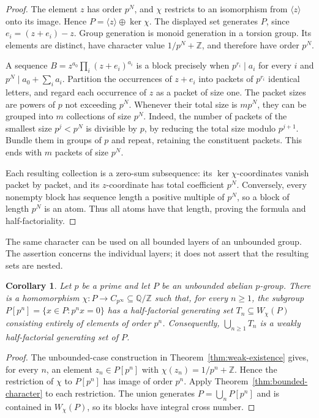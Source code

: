 \documentclass[11pt,reqno]{amsart}
\numberwithin{equation}{section}
\newtheorem{corollary}[theorem]{Corollary}
\theoremstyle{definition}
\theoremstyle{remark}
\newcommand{\Z}{\mathbb Z}
\newcommand{\Q}{\mathbb Q}
\begin{document}
\begin{proof}
The element $z$ has order $p^N$, and $\chi$ restricts to an
isomorphism from $\langle z\rangle$ onto its image. Hence
$P=\langle z\rangle\oplus\ker\chi$. The displayed set generates
$P$, since $e_i=(z+e_i)-z$. Group generation is monoid generation
in a torsion group. Its elements are distinct, have character value
$1/p^N+\Z$, and therefore have order $p^N$.

A sequence $B=z^{a_0}\prod_i(z+e_i)^{a_i}$ is a block precisely
when $p^{r_i}\mid a_i$ for every $i$ and
$p^N\mid a_0+\sum_i a_i$. Partition the occurrences of $z+e_i$
into packets of $p^{r_i}$ identical letters, and regard each
occurrence of $z$ as a packet of size one. The packet sizes are
powers of $p$ not exceeding $p^N$. Whenever their total size is
$mp^N$, they can be grouped into $m$ collections of size $p^N$.
Indeed, the number of packets of the smallest size $p^j<p^N$
is divisible by $p$, by reducing the total size modulo $p^{j+1}$.
Bundle them in groups of $p$ and repeat, retaining the constituent
packets. This ends with $m$ packets of size $p^N$.

Each resulting collection is a zero-sum subsequence: its
$\ker\chi$-coordinates vanish packet by packet, and its
$z$-coordinate has total coefficient $p^N$. Conversely, every
nonempty block has sequence length a positive multiple of $p^N$,
so a block of length $p^N$ is an atom. Thus all atoms have that
length, proving the formula and half-factoriality.
\end{proof}

The same character can be used on all bounded layers of an
unbounded group. The assertion concerns the individual layers;
it does not assert that the resulting sets are nested.

\begin{corollary}\label{cor:bounded-layers}
Let $p$ be a prime and let $P$ be an unbounded abelian $p$-group. There is a homomorphism
$\chi:P\to C_{p^\infty}\subseteq\Q/\Z$ such that, for every
$n\ge1$, the subgroup $P[p^n]=\{x\in P:p^nx=0\}$ has a
half-factorial generating set $T_n\subseteq W_\chi(P)$ consisting
entirely of elements of order $p^n$. Consequently,
$\bigcup_{n\ge1}T_n$ is a weakly half-factorial generating set
of $P$.
\end{corollary}

\begin{proof}
The unbounded-case construction in
Theorem~\ref{thm:weak-existence} gives, for every $n$, an element
$z_n\in P[p^n]$ with $\chi(z_n)=1/p^n+\Z$. Hence the restriction
of $\chi$ to $P[p^n]$ has image of order $p^n$. Apply
Theorem~\ref{thm:bounded-character} to each restriction. The union
generates $P=\bigcup_nP[p^n]$ and is contained in $W_\chi(P)$,
so its blocks have integral cross number.
\end{proof}
\end{document}
